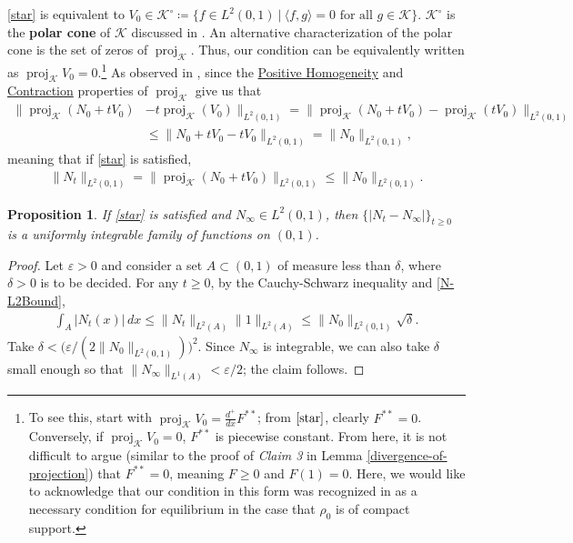 \documentclass[11pt]{article}
\newtheorem{prop}[thm]{Proposition}
\numberwithin{equation}{section}
\DeclareMathOperator{\proj}{proj}
\begin{document}
    \eqref{star} is equivalent to $V_0\in\mathcal{K}^\circ\coloneq\big\{f\in L^2(0,1) \ \big| \ \langle f,g\rangle=0 \text{ for all } g\in\mathcal{K}\}$. $\mathcal{K}^\circ$ is the \textbf{polar cone} of $\mathcal{K}$ discussed in \cite{Natile-Savare}. An alternative characterization of the polar cone is the set of zeros of $\proj_{\mathcal{K}}$. Thus, our condition can be equivalently written as $\proj_{\mathcal{K}}V_0=0$.\footnote{To see this, start with $\proj_\mathcal{K}V_0=\frac{d^+}{dx}F^{**}$; from $\eqref{star}$, clearly $F^{**}=0$. Conversely, if $\proj_\mathcal{K}V_0=0$, $F^{**}$ is piecewise constant. From here, it is not difficult to argue (similar to the proof of \textit{Claim 3} in Lemma \ref{divergence-of-projection}) that $F^{**}=0$, meaning $F\geq0$ and $F(1)=0$. Here, we would like to acknowledge that our condition in this form was recognized in \cite{Hynd-Tudorascu} as a necessary condition for equilibrium in the case that $\rho_0$ is of compact support.} As observed in \cite{Hynd-Tudorascu}, since the \hyperlink{PositiveHomogeneity}{Positive Homogeneity} and \hyperlink{Contraction}{Contraction} properties of $\proj_\mathcal{K}$ give us that 
    \begin{align*}
        \|\proj_\mathcal{K}(N_0+tV_0)&-t\proj_\mathcal{K}(V_0)\|_{L^2(0,1)}=\|\proj_\mathcal{K}(N_0+tV_0)-\proj_\mathcal{K}(tV_0)\|_{L^2(0,1)}
        \\
        &\leq\|N_0+tV_0-tV_0\|_{L^2(0,1)}=\|N_0\|_{L^2(0,1)}, 
    \end{align*}
    meaning that if \eqref{star} is satisfied, 
    \begin{align}\label{N-L2Bound}
        \|N_t\|_{L^2(0,1)}=\|\proj_\mathcal{K}(N_0+tV_0)\|_{L^2(0,1)}\leq\|N_0\|_{L^2(0,1)}. 
    \end{align}
    \begin{prop}\label{uniform-integrable}
        If \eqref{star} is satisfied and $N_\infty\in L^2(0,1)$, then $\{|N_t-N_\infty|\}_{t\geq0}$ is a uniformly integrable family of functions on $(0,1)$. 
    \end{prop}
    \begin{proof}
        Let $\varepsilon>0$ and consider a set $A\subset(0,1)$ of measure less than $\delta$, where $\delta>0$ is to be decided. For any $t\geq0$, by the Cauchy-Schwarz inequality and \eqref{N-L2Bound},
        \begin{align*}
            \int_A|N_t(x)|\, dx\leq\|N_t\|_{L^2(A)}\|1\|_{L^2(A)}\leq\|N_0\|_{L^2(0,1)}\sqrt{\delta}. 
        \end{align*}
        Take $\delta<\big(\varepsilon/(2\|N_0\|_{L^2(0,1)})\big)^2$. Since $N_\infty$ is integrable, we can also take $\delta$ small enough so that $\|N_\infty\|_{L^1(A)}<\varepsilon/2$; the claim follows. 
    \end{proof}
\end{document}
